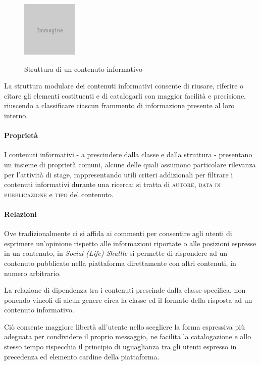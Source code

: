 \begin{figure}[ht]
	\begin{center}
		\includegraphics{placeholder.png}
		\label{fig:tesi:progetto:contenuti-informativi}
		\caption{Struttura di un contenuto informativo}
	\end{center}
\end{figure}

La struttura modulare dei contenuti informativi consente di riusare, riferire o citare gli elementi costituenti e di catalogarli con maggior facilità e precisione, riuscendo a classificare ciascun frammento di informazione presente al loro interno.

\paragraph{Proprietà}
I contenuti informativi - a prescindere dalla classe e dalla struttura - presentano un insieme di proprietà comuni, alcune delle quali assumono particolare rilevanza per l'attività di stage, rappresentando utili criteri addizionali per filtrare i contenuti informativi durante una ricerca: si tratta di \textsc{autore}, \textsc{data di pubblicazione} e \textsc{tipo} del contenuto.

\paragraph{Relazioni}
Ove tradizionalmente ci si affida ai commenti per consentire agli utenti di esprimere un'opinione rispetto alle informazioni riportate o alle posizioni espresse in un contenuto, in \textit{Social (Life) Shuttle} si permette di rispondere ad un contenuto pubblicato nella piattaforma direttamente con altri contenuti, in numero arbitrario.

La relazione di dipendenza tra i contenuti prescinde dalla classe specifica, non ponendo vincoli di alcun genere circa la classe ed il formato della risposta ad un contenuto informativo.

Ciò consente maggiore libertà all'utente nello scegliere la forma espressiva più adeguata per condividere il proprio messaggio, ne facilita la catalogazione e allo stesso tempo rispecchia il principio di uguaglianza tra gli utenti espresso in precedenza ed elemento cardine della piattaforma.

